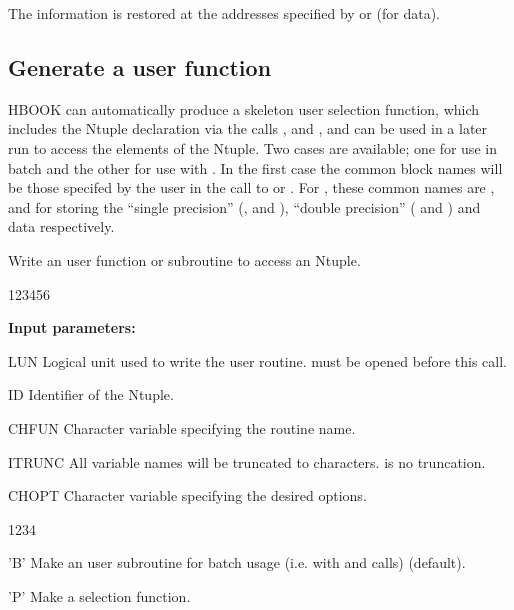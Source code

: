 The information is restored at the addresses specified by 
or  (for  data).

\newpage%

\subsection{Generate a user function}
\label{sec:userfunction}

HBOOK can automatically produce a skeleton user selection
function, which includes the Ntuple declaration via
the calls ,  and ,
and can be used in a later run to access the elements of 
the Ntuple.
Two cases are available; one for use in batch and the other for use with
\PAW.
In the first case the common block names will be those
specifed by the user in the call to  or . 
For \PAW{}, these common names are
,  and  for storing
the ``single precision'' (,  and ),
``double precision'' ( and ) and
 data respectively.

 
\Action

Write an user function or subroutine to access an Ntuple.
 
\begin{DLtt}{123456}
\item[{\rm\bf Input parameters:}]
\item[LUN] Logical unit used to write the user routine.
            must be opened before this call.
\item[ID] Identifier of the Ntuple.
\item[CHFUN] Character variable specifying the routine name.
\item[ITRUNC] All variable names will be truncated to 
              characters.  is no truncation.
\item[CHOPT]  Character variable specifying the desired options.
   \begin{DLtt}{1234}
     \item['B'] Make an user subroutine for batch usage (i.e.
                with  and  calls) (default).
     \item['P'] Make a \PAW{} selection function.
   \end{DLtt}
\end{DLtt}

